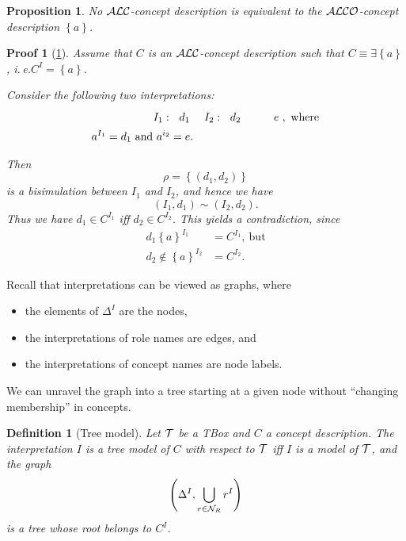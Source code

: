 \documentclass[openany]{scrbook}
\theoremstyle{break}
\newtheorem{Definition}[Theorem]{Definition}
\newtheorem{Proposition}[Theorem]{Proposition}
\theoremstyle{nonumberbreak}
\theoremstyle{nonumberplain}
\theoremstyle{nonumberbreak}
\newtheorem{Proof}{Proof}
\newcommand{\set}[1]{\left\{#1\right\}}
\newcommand{\ie}{i{.}\,e{.}\xspace}
\newcommand{\ALC}{{\cal A}{\cal L}{\cal C}}
\newcommand{\ALCO}{{\cal A}{\cal L}{\cal C}{\cal O}}
\begin{document}
\begin{Proposition}
  \label{3.5}
  No $\ALC$-concept description is equivalent to the $\ALCO$-concept
  description $\set{a}$.
\end{Proposition}

\begin{Proof}[\cref{3.5}]
  Assume that $C$ is an $\ALC$-concept description such that $C \equiv
  \exists \set{a}$, \ie $C^I = \set{a}$.

  Consider the following two interpretations:
  \begin{align*}
    I_1:\ \xymatrix{d_1} && I_2:\
    \xymatrix{d_2 & e},\ \text{where} \\
    a^{I_1} = d_1\ \text{and}\ a^{i_2} = e.
  \end{align*}

  Then
  \begin{equation*}
    \rho = \set{(d_1, d_2)}
  \end{equation*}
  is a bisimulation between $I_1$ and $I_2$, and hence we have
  \begin{equation*}
    (I_1, d_1) \sim (I_2, d_2).
  \end{equation*}
  Thus we have $d_1 \in C^{I_1}$ iff $d_2 \in C^{I_2}$. This yields a
  contradiction, since
  \begin{align*}
    d_1 \set{a}^{I_1} & = C^{I_1},\ \text{but} \\
    d_2 \not\in \set{a}^{I_2} & = C^{I_2}.
  \end{align*}
\end{Proof}

Recall that interpretations can be viewed as graphs, where
\begin{itemize}
\item the elements of $\Delta^I$ are the nodes,
\item the interpretations of role names are edges, and
\item the interpretations of concept names are node labels.
\end{itemize}
We can unravel the graph into a tree starting at a given node without
``changing membership'' in concepts.

\begin{Definition}[Tree model]
  Let ${\cal T}$ be a TBox and $C$ a concept description. The
  interpretation $I$ is a tree model of $C$ with respect to ${\cal T}$
  iff $I$ is a model of ${\cal T}$, and the graph
  \begin{equation*}
    \left(\Delta^I, \bigcup_{r \in {\cal N}_R}{r^I}\right)
  \end{equation*}
  is a tree whose root belongs to $C^I$.
\end{Definition}
\end{document}
